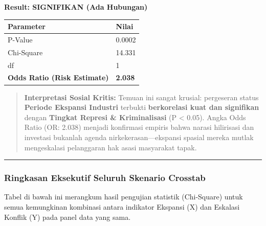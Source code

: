 \documentclass[
]{article}
\newcounter{none} %
\begin{document}
\textbf{Result: SIGNIFIKAN (Ada Hubungan)}

{\def\LTcaptype{none} %
\begin{longtable}[]{@{}ll@{}}
\toprule\noalign{}
Parameter & Nilai \\
\midrule\noalign{}
\endhead
\bottomrule\noalign{}
\endlastfoot
P-Value & 0.0002 \\
Chi-Square & 14.331 \\
df & 1 \\
\textbf{Odds Ratio (Risk Estimate)} & \textbf{2.038} \\
\end{longtable}
}

\begin{quote}
\textbf{Interpretasi Sosial Kritis:} Temuan ini sangat krusial:
pergeseran status \textbf{Periode Ekspansi Industri} terbukti
\textbf{berkorelasi kuat dan signifikan} dengan \textbf{Tingkat Represi
\& Kriminalisasi} (P \textless{} 0.05). Angka Odds Ratio (OR: 2.038)
menjadi konfirmasi empiris bahwa narasi hilirisasi dan investasi
bukanlah agenda nirkekerasan---ekspansi spasial mereka mutlak
mengeskalasi pelanggaran hak asasi masyarakat tapak.
\end{quote}

\begin{center}\rule{0.5\linewidth}{0.5pt}\end{center}

\subsubsection{Ringkasan Eksekutif Seluruh Skenario
Crosstab}\label{ringkasan-eksekutif-seluruh-skenario-crosstab}

Tabel di bawah ini merangkum hasil pengujian statistik (Chi-Square)
untuk semua kemungkinan kombinasi antara indikator Ekspansi (X) dan
Eskalasi Konflik (Y) pada panel data yang sama.
\end{document}
